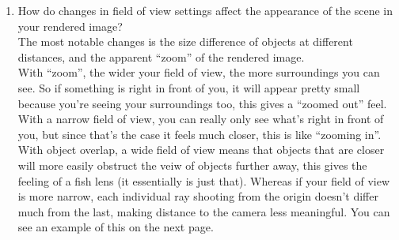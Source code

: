 \documentclass{assignment}
\newcommand{\n}{\vspace{0.2cm}}
\begin{document}
\begin{enumerate}
 \item How do changes in field of view settings affect the appearance of the scene in your rendered image? \n\\
       The most notable changes is the size difference of objects at different distances, and the apparent ``zoom'' of the rendered image. \n \\
       With ``zoom'', the wider your field of view, the more surroundings you can see.  So if something is right in front of you, it will appear pretty small because you're seeing your surroundings too, this gives a ``zoomed out'' feel.  With a narrow field of view, you can really only see what's right in front of you, but since that's the case it feels much closer, this is like ``zooming in''. \n\\
       With object overlap, a wide field of view means that objects that are closer will more easily obstruct the veiw of objects further away, this gives the feeling of a fish lens (it essentially is just that).  Whereas if your field of view is more narrow, each individual ray shooting from the origin doesn't differ much from the last, making distance to the camera less meaningful.  You can see an example of this on the next page.


\end{enumerate}
\end{document}
